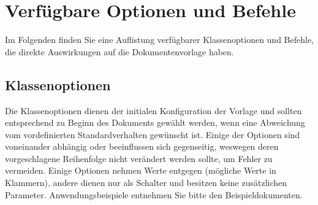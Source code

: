 \documentclass[
%
	thesis=paper,		%
	compactlistof,		%
	noauthorship,		%
%
	fancy,				%
%
%
]{hsmw-thesis}
\begin{document}
	
	
	\chapter{Verfügbare Optionen und Befehle}
	\label{cha:optionsAndCommands}
	
	Im Folgenden finden Sie eine Auflistung verfügbarer Klassenoptionen und Befehle, die direkte Auswirkungen auf die Dokumentenvorlage haben.
	
	\section{Klassenoptionen}
	
	Die Klassenoptionen dienen der initialen Konfiguration der Vorlage und sollten entsprechend zu Beginn des Dokuments gewählt werden, wenn eine Abweichung vom vordefinierten Standardverhalten gewünscht ist.
	Einige der Optionen sind voneinander abhängig oder beeinflussen sich gegenseitig, weswegen deren vorgeschlagene Reihenfolge nicht verändert werden sollte, um Fehler zu vermeiden.
	Einige Optionen nehmen Werte entgegen (mögliche Werte in Klammern), andere dienen nur als Schalter und besitzen keine zusätzlichen Parameter.
	Anwendungsbeispiele entnehmen Sie bitte den Beispieldokumenten.
	
\end{document}
